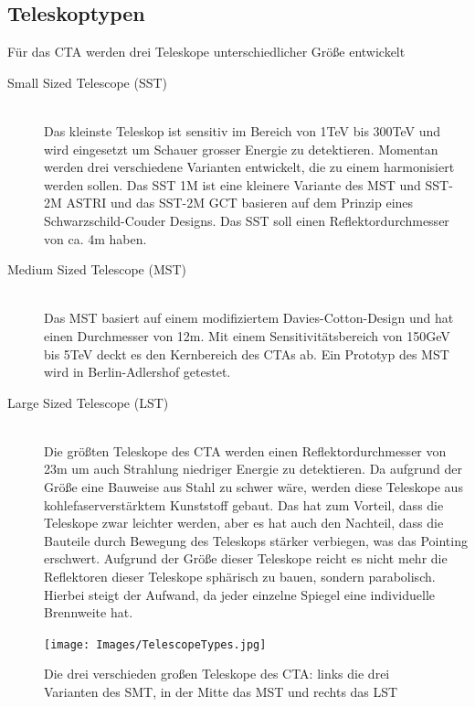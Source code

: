 \subsection{Teleskoptypen}
Für das CTA werden drei Teleskope unterschiedlicher Größe entwickelt
\begin{description}
\item[Small Sized Telescope (SST)]\hfill \\
Das kleinste Teleskop ist sensitiv im Bereich von 1TeV bis 300TeV und wird eingesetzt um Schauer grosser Energie zu detektieren. Momentan werden drei verschiedene Varianten entwickelt, die zu einem harmonisiert werden sollen. Das SST 1M ist eine kleinere Variante des MST und SST-2M  ASTRI und das SST-2M GCT basieren auf dem Prinzip eines Schwarzschild-Couder Designs. Das SST soll einen Reflektordurchmesser von ca. 4m haben.
\item[Medium Sized Telescope (MST)]\hfill \\ 
Das MST basiert auf einem modifiziertem Davies-Cotton-Design und hat einen Durchmesser von 12m. Mit einem Sensitivitätsbereich von 150GeV bis 5TeV deckt es den Kernbereich des CTAs ab. Ein Prototyp des MST wird in Berlin-Adlershof getestet.
\item[Large Sized Telescope (LST)]\hfill \\
Die größten Teleskope des CTA werden einen Reflektordurchmesser von 23m um auch Strahlung niedriger Energie zu detektieren. Da aufgrund der Größe eine Bauweise aus Stahl zu schwer wäre, werden diese Teleskope aus kohlefaserverstärktem Kunststoff gebaut. Das hat zum Vorteil, dass die Teleskope zwar leichter werden, aber es hat auch den Nachteil, dass die Bauteile durch Bewegung des Teleskops stärker verbiegen, was das Pointing erschwert. Aufgrund der Größe dieser Teleskope reicht es nicht mehr die Reflektoren dieser Teleskope sphärisch zu bauen, sondern parabolisch. Hierbei steigt der Aufwand, da jeder einzelne Spiegel eine individuelle Brennweite hat.
\end{description}
\begin{figure}[htbp]
\centering
\texttt{[image: Images/TelescopeTypes.jpg]}
\caption{Die drei verschieden großen Teleskope des CTA: links die drei Varianten des SMT, in der Mitte das MST und rechts das LST}
\label{img:TelescopeTypes}
\end{figure}

